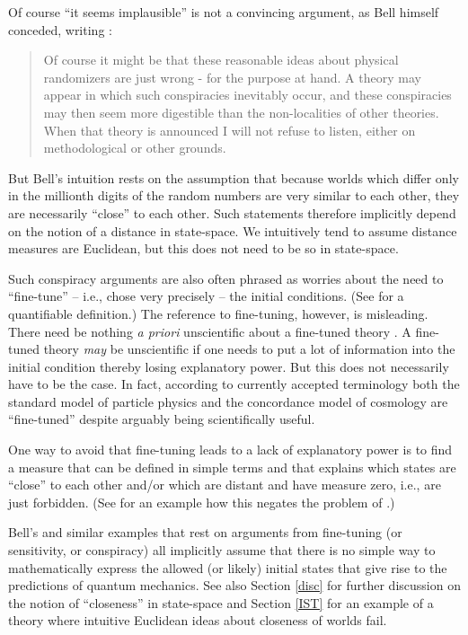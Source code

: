 \documentclass[12pt]{article}
\begin{document}
Of course ``it seems implausible'' is not a convincing argument, as Bell himself conceded, writing  \cite{Bell:1987hh}:
\begin{quote}
Of course it might be that these reasonable ideas about physical 
randomizers are just wrong - for the purpose at hand. A theory may 
appear in which such conspiracies inevitably occur, and these 
conspiracies may then seem more digestible than the non-localities of 
other theories. When that theory is announced I will not refuse to 
listen, either on methodological or other grounds. 
\end{quote}
But Bell's intuition rests on the assumption that because worlds which differ only in the millionth digits of the random numbers are very similar to each other, they are necessarily ``close'' to each other. Such statements therefore implicitly depend on the notion of a distance in state-space. We intuitively tend to assume distance measures are Euclidean, but this does not need to be so in state-space. 

Such conspiracy arguments are also often phrased as worries about the need to ``fine-tune'' -- i.e., chose very precisely -- the initial conditions. (See \cite{finetuning} for a quantifiable definition.) The reference to fine-tuning, however, is misleading. There need be nothing {\sl a priori} unscientific about a fine-tuned theory \cite{Hossenfelder:2018ikr}. A fine-tuned theory {\sl may} be unscientific if one needs to put a lot of information into the initial condition thereby losing explanatory power. But this does not necessarily have to be the case. In fact, according to currently accepted terminology both the standard model of particle physics and the concordance model of cosmology are ``fine-tuned'' despite arguably being scientifically useful. 

One way to avoid that fine-tuning leads to a lack of explanatory power is to find a measure that can be defined in simple terms and that explains which states are ``close'' to each other and/or which are distant and have measure zero, i.e., are just forbidden. (See \cite{rfinetuning} for an example how this negates the problem of \cite{finetuning}.) 

Bell's and similar examples that rest on arguments from fine-tuning (or sensitivity, or conspiracy) all implicitly assume that there is no simple way to mathematically express the allowed (or likely) initial states that give rise to the predictions of quantum mechanics. See also Section \ref{disc} for further discussion on the notion of ``closeness'' in state-space and Section \ref{IST} for an example of a theory where intuitive Euclidean ideas about closeness of worlds fail.
\end{document}
